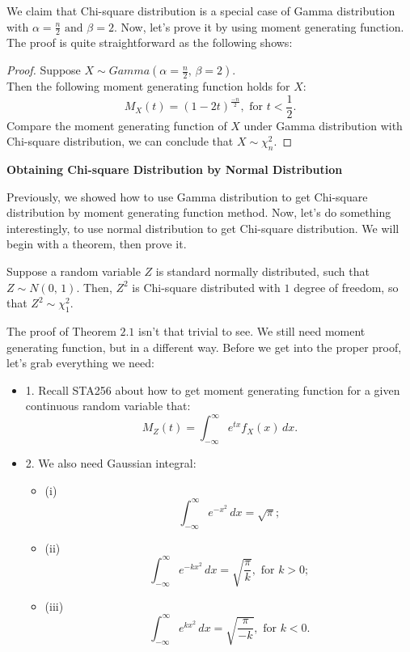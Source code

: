 We claim that Chi-square distribution is a special case of Gamma distribution with $\alpha = \frac{n}{2} \text{ and } \beta = 2$. Now, let's prove it by using moment generating function.\\

The proof is quite straightforward as the following shows:

\begin{proof} Suppose $X \sim Gamma( \alpha = \frac{n}{2} \text{, } \beta = 2).$ \\
Then the following moment generating function holds for $X$: \[ M_{X}(t) = (1- 2t)^{\frac{-n}{2}}, \text{ for $t < \frac{1}{2}$}.\]
Compare the moment generating function of $X$ under Gamma distribution with Chi-square distribution, we can conclude that $X \sim \chi_{n}^{2}$.
\end{proof}

\textbf{Obtaining Chi-square Distribution by Normal Distribution}

Previously, we showed how to use Gamma distribution to get Chi-square distribution by moment generating function method. Now, let's do something interestingly, to use normal distribution to get Chi-square distribution. We will begin with a theorem, then prove it.

\begin{theorem}
Suppose a random variable $Z$ is standard normally distributed, such that $Z \sim N(0 \text{, }1).$ Then, $Z^2$ is Chi-square distributed with $1$ degree of freedom, so that $Z^2 \sim \chi_{1}^{2}$.
\end{theorem}

The proof of Theorem $2.1$ isn't that trivial to see. We still need moment generating function, but in a different way. Before we get into the proper proof, let's grab everything we need:

\begin{itemize}
	\item 1. Recall STA256 about how to get moment generating function for a given continuous random variable that: \[ M_{Z}(t) = \int_{-\infty}^{\infty} e^{tx}f_{X}(x)\,dx.\]
	\item 2. We also need Gaussian integral:
	\begin{itemize}
		\item (i) \[ \int_{-\infty}^{\infty} e^{-x^2}\,dx = \sqrt{\pi};\]
		\item (ii) \[ \int_{-\infty}^{\infty} e^{-kx^2}\,dx = \sqrt{\frac{\pi}{k}}, \text{ for $k > 0$};\]
		\item (iii) \[ \int_{-\infty}^{\infty} e^{kx^2}\,dx = \sqrt{\frac{\pi}{-k}}, \text{ for $k < 0$}.\]
	\end{itemize}
\end{itemize}

